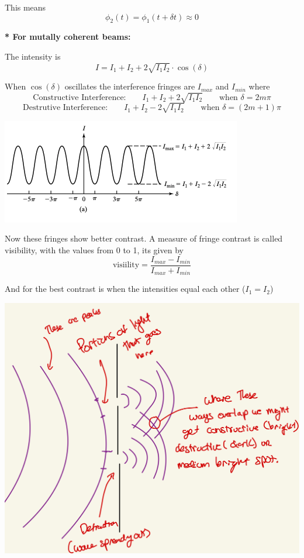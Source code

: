 \documentclass[10pt]{article}
\newcommand*{\lo}[1]{
    \textbf{* #1} \newline
}
\begin{document}
This means
\[\phi_2(t) = \phi_1(t + \delta t) \approx 0\]

\lo{For mutally coherent beams:}
The intensity is \[I = I_1 + I_2 + 2\sqrt{I_1I_2}\cdot \cos(\delta)\]


When $\cos(\delta)$ oscillates the interference fringes are $I_{max}$ and $I_{min}$ where 
\[\text{Constructive Interference:} \qquad I_1 + I_2 + 2 \sqrt{I_1I_2} \qquad \text{when } \delta = 2m\pi\]
\[\text{Destrutive Interference:} \qquad I_1 + I_2 - 2 \sqrt{I_1I_2} \qquad \text{when } \delta = (2m+1)\pi\]

\begin{center}
    \includegraphics*[scale = 1]{imgs/min-max-intensity.png}
\end{center}

Now these fringes show better contrast. A measure of fringe contrast is called visibility, with the values from 0 to 1, its given by
\[\text{visiility} = \frac{I_{max}-I_{min}}{I_{max} + I_{min}}\]

And for the best contrast is when the intensities equal each other ($I_1 = I_2$)

\newpage 




\begin{center}
    \includegraphics*[scale = .25]{imgs/wavefront.jpeg}
\end{center}
\end{document}
